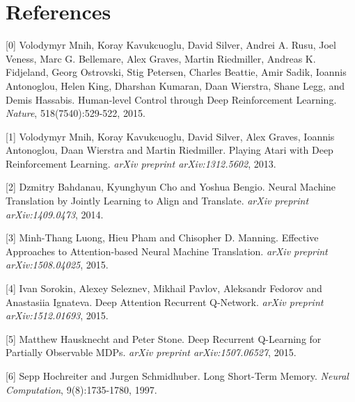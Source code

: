 \documentclass{article}
\begin{document}
\section*{References}
\small
[0] Volodymyr Mnih, Koray Kavukcuoglu, David Silver, Andrei A. Rusu, Joel Veness, Marc G. Bellemare, Alex Graves, Martin Riedmiller, Andreas K. Fidjeland, Georg Ostrovski, Stig Petersen, Charles Beattie, Amir Sadik, Ioannis Antonoglou, Helen King, Dharshan Kumaran, Daan Wierstra, Shane Legg, and Demis Hassabis. Human-level Control through Deep Reinforcement Learning. {\it Nature}, 518(7540):529-522, 2015.

[1] Volodymyr Mnih, Koray Kavukcuoglu, David Silver, Alex Graves, Ioannis Antonoglou, Daan Wierstra and Martin Riedmiller. Playing Atari with Deep Reinforcement Learning. {\it arXiv preprint arXiv:1312.5602}, 2013.

[2] Dzmitry Bahdanau, Kyunghyun Cho and Yoshua Bengio. Neural Machine Translation by Jointly Learning to Align and Translate. {\it arXiv preprint arXiv:1409.0473}, 2014.

[3] Minh-Thang Luong, Hieu Pham and Chisopher D. Manning. Effective Approaches to Attention-based Neural Machine Translation. {\it arXiv preprint arXiv:1508.04025}, 2015.

[4] Ivan Sorokin, Alexey Seleznev, Mikhail Pavlov, Aleksandr Fedorov and Anastasiia Ignateva. Deep Attention Recurrent Q-Network. {\it arXiv preprint arXiv:1512.01693}, 2015.

[5] Matthew Hausknecht and Peter Stone. Deep Recurrent Q-Learning for Partially Observable MDPs. {\it arXiv preprint arXiv:1507.06527}, 2015.

[6] Sepp Hochreiter and Jurgen Schmidhuber. Long Short-Term Memory. {\it Neural Computation}, 9(8):1735-1780, 1997.
\end{document}
